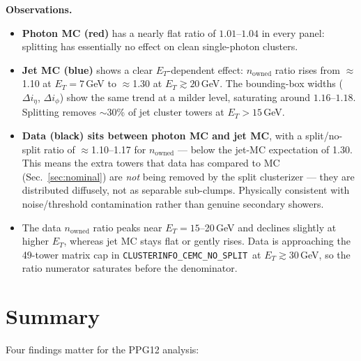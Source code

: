 \documentclass[11pt,a4paper]{article}
\newcommand{\dietag}{$\Delta i_\eta$}
\newcommand{\diphig}{$\Delta i_\phi$}
\newcommand{\nosplitnode}{\texttt{CLUSTERINFO\_CEMC\_NO\_SPLIT}}
\begin{document}
\textbf{Observations.}
\begin{itemize}
\item \textbf{Photon MC (red)} has a nearly flat ratio of $1.01$--$1.04$
  in every panel: splitting has essentially no effect on clean
  single-photon clusters.
\item \textbf{Jet MC (blue)} shows a clear $E_T$-dependent effect:
  $n_{\mathrm{owned}}$ ratio rises from $\approx$1.10 at $E_T = 7$\,GeV
  to $\approx$1.30 at $E_T \gtrsim 20$\,GeV.  The bounding-box widths
  (\dietag, \diphig) show the same trend at a milder level, saturating
  around $1.16$--$1.18$.  Splitting removes $\sim$30\% of jet cluster
  towers at $E_T > 15$\,GeV.
\item \textbf{Data (black) sits between photon MC and jet MC},
  with a split/no-split ratio of $\approx$1.10--1.17 for $n_{\mathrm{owned}}$
  --- below the jet-MC expectation of 1.30.  This means the extra towers
  that data has compared to MC (Sec.~\ref{sec:nominal}) are \emph{not}
  being removed by the split clusterizer --- they are distributed
  diffusely, not as separable sub-clumps.  Physically consistent with
  noise/threshold contamination rather than genuine secondary showers.
\item The data $n_{\mathrm{owned}}$ ratio peaks near $E_T = 15$--20\,GeV
  and declines slightly at higher $E_T$, whereas jet MC stays flat
  or gently rises.  Data is approaching the 49-tower matrix cap in
  \nosplitnode\ at $E_T \gtrsim 30$\,GeV, so the ratio numerator
  saturates before the denominator.
\end{itemize}

\section{Summary}
\label{sec:summary}

Four findings matter for the PPG12 analysis:
\end{document}
